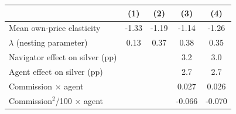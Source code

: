 \begin{tabular}{lcccc}
\hline\hline
 & (1) & (2) & (3) & (4) \\
\hline
Mean own-price elasticity & -1.33 & -1.19 & -1.14 & -1.26 \\
$\lambda$ (nesting parameter) & 0.13 & 0.37 & 0.38 & 0.35 \\
Navigator effect on silver (pp) &  &  & 3.2 & 3.0 \\
Agent effect on silver (pp) &  &  & 2.7 & 2.7 \\
Commission $\times$ agent &  &  & 0.027 & 0.026 \\
Commission$^2$/100 $\times$ agent &  &  & -0.066 & -0.070 \\
\hline\hline
\end{tabular}
